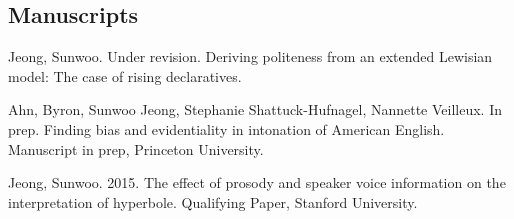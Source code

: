 \documentclass[letterpaper]{article}
\renewenvironment{itemize}{
  \begin{list}{}{
    \setlength{\leftmargin}{1.5em}
  }
}{
  \end{list}
}
\begin{document}




\subsection*{Manuscripts}

\begin{itemize}
\item Jeong, Sunwoo. Under revision. Deriving politeness from an extended Lewisian model: The case of rising declaratives.\ 

\item Ahn, Byron, Sunwoo Jeong, Stephanie Shattuck-Hufnagel, Nannette Veilleux. In prep. Finding bias and evidentiality in intonation of American English. Manuscript in prep, Princeton University.

\item Jeong, Sunwoo. 2015. The effect of prosody and speaker voice information on the interpretation of hyperbole. Qualifying Paper, Stanford University.
\end{itemize}





\end{document}
